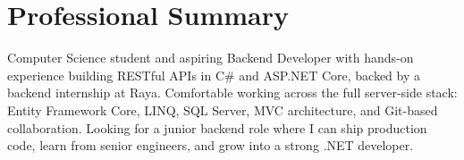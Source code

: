 \section*{Professional Summary}
Computer Science student and aspiring Backend Developer with hands-on experience
building RESTful APIs in C\# and ASP.NET Core, backed by a backend internship at
Raya. Comfortable working across the full server-side stack: Entity Framework
Core, LINQ, SQL Server, MVC architecture, and Git-based collaboration. Looking
for a junior backend role where I can ship production code, learn from senior
engineers, and grow into a strong .NET developer.
